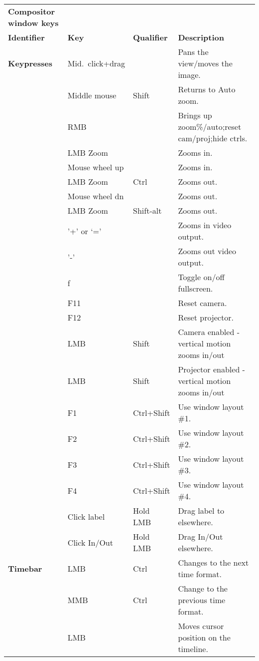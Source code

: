 \begin{longtable}[h]{>{\bfseries}p{}p{}p{}p{}}
  \toprule
  \multicolumn{4}{c}%
  {\textcolor{CinRed}{\textbf{Compositor window keys}}} \\
  Identifier & \textbf{Key} & \textbf{Qualifier} & \textbf{Description}\\
  \midrule
  \endhead
  \textcolor{CinBlueText}{Keypresses} & Mid.\ click+drag &  & Pans the view/moves the image. \\
  & Middle mouse & Shift & Returns to Auto zoom. \\
  & RMB &  & Brings up zoom\%/auto;reset cam/proj;hide ctrls. \\
  & LMB Zoom &  & Zooms in. \\
  & Mouse wheel up &  & Zooms in. \\
  & LMB Zoom & Ctrl & Zooms out. \\
  & Mouse wheel dn &  & Zooms out. \\
  & LMB Zoom & Shift-alt & Zooms out. \\
  & '+' or ‘=’ &  & Zooms in video output. \\
  & '-' &  & Zooms out video output. \\
  & f &  & Toggle on/off fullscreen. \\
  & F11 &  & Reset camera. \\
  & F12 &  & Reset projector. \\
  & LMB & Shift & Camera enabled - vertical motion zooms in/out\\
  & LMB & Shift & Projector enabled - vertical motion zooms in/out\\
  & F1 & Ctrl+Shift & Use window layout \#1. \\
  & F2 & Ctrl+Shift & Use window layout \#2. \\
  & F3 & Ctrl+Shift & Use window layout \#3. \\
  & F4 & Ctrl+Shift & Use window layout \#4. \\
  & Click label & Hold LMB & Drag label to elsewhere. \\
  & Click In/Out & Hold LMB & Drag In/Out elsewhere. \\
  \midrule
  \textcolor{CinBlueText}{Timebar} & LMB & Ctrl & Changes to the next time format. \\
  & MMB & Ctrl & Change to the previous time format. \\
  & LMB &  & Moves cursor position on the timeline. \\

\end{longtable}
